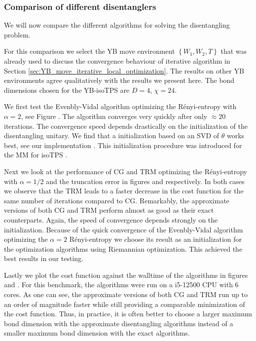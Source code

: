 \subsubsection*{\hspace{105pt}Comparison of different disentanglers}
We will now compare the different algorithms for solving the disentangling problem.


For this comparison we select the YB move environment $\left\{W_1, W_2, T\right\}$ that was already used to discuss the convergence behaviour of iterative algorithm in Section \ref{sec:YB_move_iterative_local_optimization}. The results on other YB environments agree qualitatively with the results we present here. The bond dimensions chosen for the YB-isoTPS are $D = 4$, $\chi = 24$. \par
We first test the Evenbly-Vidal algorithm optimizing the Rényi-entropy with $\alpha = 2$, see Figure . The algorithm converges very quickly after only $\approx 20$ iterations. The convergence speed depends drastically on the initialization of the disentangling unitary. We find that a initialization based on an SVD of $\theta$ works best, see our implementation \cite{cite:github_YB_isoTPS}. This initialization procedure was introduced for the MM for isoTPS \cite{cite:isometric_tensor_network_states_in_two_dimensions, cite:efficient_simulation_of_dynamics_in_two_dimensional_quantum_spin_systems}. \par
Next we look at the performance of CG and TRM optimizing the Rényi-entropy with $\alpha = 1/2$ and the truncation error in figures  and  respectively. In both cases we observe that the TRM leads to a faster decrease in the cost function for the same number of iterations compared to CG. Remarkably, the approximate versions of both CG and TRM perform almost as good as their exact counterparts. Again, the speed of convergence depends strongly on the initialization. Because of the quick convergence of the Evenbly-Vidal algorithm optimizing the $\alpha = 2$ Rényi-entropy we choose its result as an initialization for the optimization algorithms using Riemannian optimization. This achieved the best results in our testing. \par
Lastly we plot the cost function against the walltime of the algorithms in figures  and . For this benchmark, the algorithms were run on a i5-12500 CPU with 6 cores. As one can see, the approximate versions of both CG and TRM run up to an order of magnitude faster while still providing a comparable minimization of the cost function. Thus, in practice, it is often better to choose a larger maximum bond dimension with the approximate disentangling algorithms instead of a smaller maximum bond dimension with the exact algorithms.
